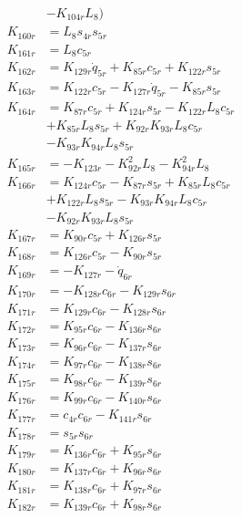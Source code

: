 \begin{multicols}{2}
\begin{align}
&- K_{104r}L_8) \nonumber \\
K_{160r} &= L_8s_{4r}s_{5r} \nonumber \\
K_{161r} &= L_8c_{5r} \nonumber \\
K_{162r} &= K_{129r}\dot{q}_{5r} + K_{85r}c_{5r} + K_{122r}s_{5r} \nonumber \\
K_{163r} &= K_{122r}c_{5r} - K_{127r}\dot{q}_{5r} - K_{85r}s_{5r} \nonumber \\
K_{164r} &= K_{87r}c_{5r} + K_{124r}s_{5r} - K_{122r}L_8c_{5r}  \nonumber \\
&+ K_{85r}L_8s_{5r} + K_{92r}K_{93r}L_8c_{5r}  \nonumber \\
&- K_{93r}K_{94r}L_8s_{5r} \nonumber \\
K_{165r} &= - K_{123r} - K_{92r}^2L_8 - K_{94r}^2L_8 \nonumber \\
K_{166r} &= K_{124r}c_{5r} - K_{87r}s_{5r} + K_{85r}L_8c_{5r}  \nonumber \\
&+ K_{122r}L_8s_{5r} - K_{93r}K_{94r}L_8c_{5r}  \nonumber \\
&- K_{92r}K_{93r}L_8s_{5r} \nonumber \\
K_{167r} &= K_{90r}c_{5r} + K_{126r}s_{5r} \nonumber \\
K_{168r} &= K_{126r}c_{5r} - K_{90r}s_{5r} \nonumber \\
K_{169r} &= - K_{127r} - \dot{q}_{6r} \nonumber \\
K_{170r} &= - K_{128r}c_{6r} - K_{129r}s_{6r} \nonumber \\
K_{171r} &= K_{129r}c_{6r} - K_{128r}s_{6r} \nonumber \\
K_{172r} &= K_{95r}c_{6r} - K_{136r}s_{6r} \nonumber \\
K_{173r} &= K_{96r}c_{6r} - K_{137r}s_{6r} \nonumber \\
K_{174r} &= K_{97r}c_{6r} - K_{138r}s_{6r} \nonumber \\
K_{175r} &= K_{98r}c_{6r} - K_{139r}s_{6r} \nonumber \\
K_{176r} &= K_{99r}c_{6r} - K_{140r}s_{6r} \nonumber \\
K_{177r} &= c_{4r}c_{6r} - K_{141r}s_{6r} \nonumber \\
K_{178r} &= s_{5r}s_{6r} \nonumber \\
K_{179r} &= K_{136r}c_{6r} + K_{95r}s_{6r} \nonumber \\
K_{180r} &= K_{137r}c_{6r} + K_{96r}s_{6r} \nonumber \\
K_{181r} &= K_{138r}c_{6r} + K_{97r}s_{6r} \nonumber \\
K_{182r} &= K_{139r}c_{6r} + K_{98r}s_{6r} \nonumber \\

\end{align}
\end{multicols}
